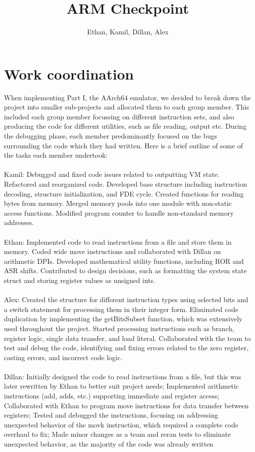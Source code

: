 \documentclass[11pt]{article}
\begin{document}
\title{ARM Checkpoint}
\author{Ethan, Kamil, Dillan, Alex}

\maketitle

\section{Work coordination}

When implementing Part I, the AArch64 emulator, we decided to break down the project into
smaller sub-projects and allocated them to each group member. This included each group member
focussing on different instruction sets, and also producing the code for different utilities, such as
file reading, output etc. During the debugging phase, each member predominantly focused on the
bugs surrounding the code which they had written. Here is a brief outline of some of the tasks each
member undertook:
\\
\\
Kamil: Debugged and fixed code issues related to outputting VM state. Refactored and reorganized code. Developed base structure including instruction decoding, structure initialization, and
FDE cycle. Created functions for reading bytes from memory. Merged memory pools into one module with non-static access functions. Modified program counter to handle non-standard memory
addresses.
\\
\\
Ethan: Implemented code to read instructions from a file and store them in memory. Coded
wide move instructions and collaborated with Dillan on arithmetic DPIs. Developed mathematical
utility functions, including ROR and ASR shifts. Contributed to design decisions, such as formatting the system state struct and storing register values as unsigned ints.
\\
\\
Alex: Created the structure for different instruction types using selected bits and a switch statement for processing them in their integer form. Eliminated code duplication by implementing the
getBitsSubset function, which was extensively used throughout the project. Started processing instructions such as branch, register logic, single data transfer, and load literal. Collaborated with the
team to test and debug the code, identifying and fixing errors related to the zero register, casting
errors, and incorrect code logic.
\\
\\
Dillan: Initially designed the code to read instructions from a file, but this was later rewritten
by Ethan to better suit project needs; Implemented arithmetic instructions (add, adds, etc.) supporting immediate and register access; Collaborated with Ethan to program move instructions for
data transfer between registers; Tested and debugged the instructions, focusing on addressing unexpected behavior of the movk instruction, which required a complete code overhaul to fix; Made
minor changes as a team and reran tests to eliminate unexpected behavior, as the majority of the
code was already written
\end{document}

